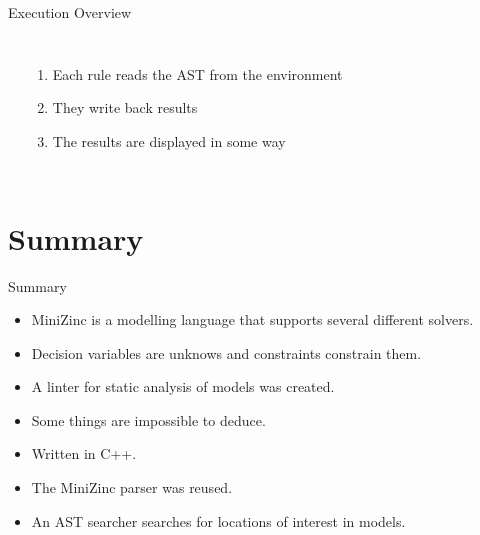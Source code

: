 \documentclass[aspectratio=169]{beamer} %
\begin{document}

\begin{frame}{Execution Overview}
  \begin{columns}
    \begin{center}
      
    \end{center}

    \pause
    \begin{enumerate}
      \item Each rule reads the AST from the environment\pause
      \item They write back results\pause
      \item The results are displayed in some way
    \end{enumerate}
  \end{columns}
\end{frame}


\section{Summary}
\begin{frame}{Summary}
  \begin{itemize}
    \item MiniZinc is a modelling language that supports several different solvers.
    \item Decision variables are unknows and constraints constrain them.
    \item A linter for static analysis of models was created.
    \item Some things are impossible to deduce.
    \item Written in C++.
    \item The MiniZinc parser was reused.
    \item An AST searcher searches for locations of interest in models.
  \end{itemize}
\end{frame}
\end{document}
